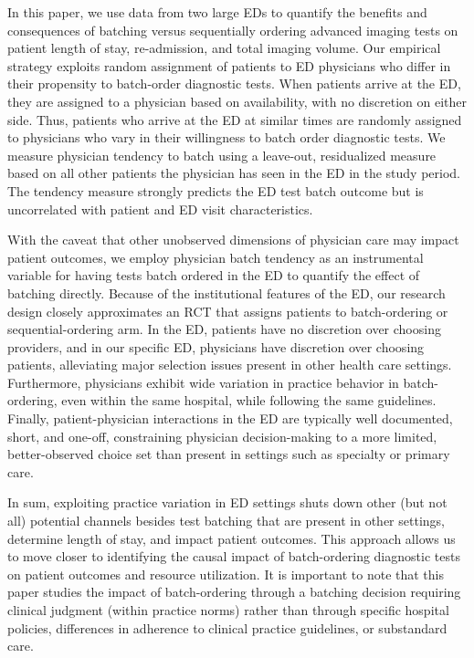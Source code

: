 \documentclass{article}
\begin{document}
In this paper, we use data from two large EDs to quantify the benefits
and consequences of batching versus sequentially ordering advanced
imaging tests on patient length of stay, re-admission, and total imaging
volume. Our empirical strategy exploits random assignment of patients to
ED physicians who differ in their propensity to batch-order diagnostic
tests. When patients arrive at the ED, they are assigned to a physician
based on availability, with no discretion on either side. Thus, patients
who arrive at the ED at similar times are randomly assigned to
physicians who vary in their willingness to batch order diagnostic
tests. We measure physician tendency to batch using a leave-out,
residualized measure based on all other patients the physician has seen
in the ED in the study period. The tendency measure strongly predicts
the ED test batch outcome but is uncorrelated with patient and ED visit
characteristics.

With the caveat that other unobserved dimensions of physician care may
impact patient outcomes, we employ physician batch tendency as an
instrumental variable for having tests batch ordered in the ED to
quantify the effect of batching directly. Because of the institutional
features of the ED, our research design closely approximates an RCT that
assigns patients to batch-ordering or sequential-ordering arm. In the
ED, patients have no discretion over choosing providers, and in our
specific ED, physicians have discretion over choosing patients,
alleviating major selection issues present in other health care
settings. Furthermore, physicians exhibit wide variation in practice
behavior in batch-ordering, even within the same hospital, while
following the same guidelines. Finally, patient-physician interactions
in the ED are typically well documented, short, and one-off,
constraining physician decision-making to a more limited,
better-observed choice set than present in settings such as specialty or
primary care.

In sum, exploiting practice variation in ED settings shuts down other
(but not all) potential channels besides test batching that are present
in other settings, determine length of stay, and impact patient
outcomes. This approach allows us to move closer to identifying the
causal impact of batch-ordering diagnostic tests on patient outcomes and
resource utilization. It is important to note that this paper studies
the impact of batch-ordering through a batching decision requiring
clinical judgment (within practice norms) rather than through specific
hospital policies, differences in adherence to clinical practice
guidelines, or substandard care.
\end{document}
